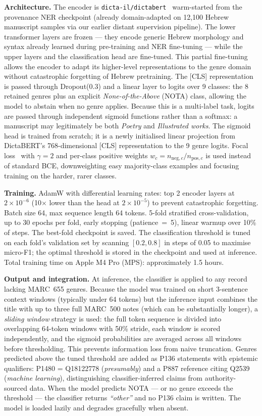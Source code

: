 \documentclass[Afour,sageh,times]{sagej}
\begin{document}
\textbf{Architecture.} The encoder is \texttt{dicta-il/dictabert}~\cite{shmidman2023dictabert} warm-started from the provenance NER checkpoint (already domain-adapted on 12,100 Hebrew manuscript samples via our earlier distant supervision pipeline). The lower transformer layers are frozen --- they encode generic Hebrew morphology and syntax already learned during pre-training and NER fine-tuning --- while the upper layers and the classification head are fine-tuned. This partial fine-tuning allows the encoder to adapt its higher-level representations to the genre domain without catastrophic forgetting of Hebrew pretraining. The [CLS] representation is passed through Dropout(0.3) and a linear layer to logits over 9 classes: the 8 retained genres plus an explicit \emph{None-of-the-Above} (NOTA) class, allowing the model to abstain when no genre applies. Because this is a multi-label task, logits are passed through independent sigmoid functions rather than a softmax: a manuscript may legitimately be both \emph{Poetry} and \emph{Illustrated works}. The sigmoid head is trained from scratch; it is a newly initialised linear projection from DictaBERT's 768-dimensional [CLS] representation to the 9 genre logits. Focal loss~\cite{lin2017focal} with $\gamma=2$ and per-class positive weights $w_c = n_{\text{neg},c}/n_{\text{pos},c}$ is used instead of standard BCE, downweighting easy majority-class examples and focusing training on the harder, rarer classes.

\textbf{Training.} AdamW with differential learning rates: top 2 encoder layers at $2 \times 10^{-6}$ (10$\times$ lower than the head at $2 \times 10^{-5}$) to prevent catastrophic forgetting. Batch size 64, max sequence length 64 tokens. 5-fold stratified cross-validation, up to 30 epochs per fold, early stopping (patience~=~5), linear warmup over 10\% of steps. The best-fold checkpoint is saved. The classification threshold is tuned on each fold's validation set by scanning $[0.2, 0.8]$ in steps of 0.05 to maximise micro-F1; the optimal threshold is stored in the checkpoint and used at inference. Total training time on Apple M4 Pro (MPS): approximately 1.5 hours.

\textbf{Output and integration.} At inference, the classifier is applied to any record lacking MARC~655 genres. Because the model was trained on short 3-sentence context windows (typically under 64 tokens) but the inference input combines the title with up to three full MARC~500 notes (which can be substantially longer), a \emph{sliding window} strategy is used: the full token sequence is divided into overlapping 64-token windows with 50\% stride, each window is scored independently, and the sigmoid probabilities are averaged across all windows before thresholding. This prevents information loss from naive truncation. Genres predicted above the tuned threshold are added as P136 statements with epistemic qualifiers: P1480 = Q18122778 (\emph{presumably}) and a P887 reference citing Q2539 (\emph{machine learning}), distinguishing classifier-inferred claims from authority-sourced data. When the model predicts NOTA — or no genre exceeds the threshold — the classifier returns \emph{``other''} and no P136 claim is written. The model is loaded lazily and degrades gracefully when absent.
\end{document}
